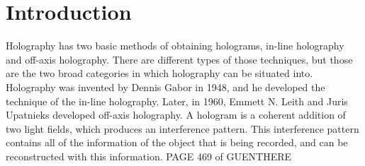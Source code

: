 


\chapter{Introduction} \label{chap:Intro}

Holography has two basic methods of obtaining holograms, in-line holography and
off-axis holography. There are different types of those techniques, but those
are the two broad categories in which holography can be situated into.
Holography was invented by Dennis Gabor in 1948, and he developed the technique
of the in-line holography. Later, in 1960, Emmett N. Leith and Juris Upatnieks developed
off-axis holography.
A hologram is a coherent addition of two light fields, which produces an
interference pattern. This interference pattern contains all of the information
of the object that is being recorded, and can be reconstructed with this
information.
PAGE 469 of GUENTHERE


